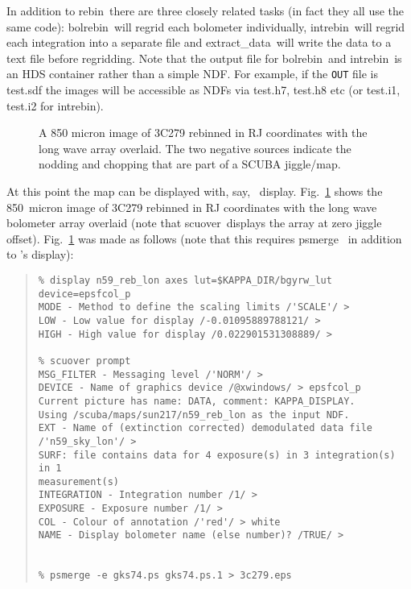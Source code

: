 \documentclass[twoside,11pt]{article}
\newcommand{\Kappa}{\xref{{\sc{Kappa}}}{sun95}{}}
\newcommand{\task}[1]{{\sf #1}}
\newcommand{\param}[1]{{\tt #1}}
\newcommand{\rebin}{\htmlref{\task{rebin}}{REBIN}}
\newcommand{\bolrebin}{\htmlref{\task{bolrebin}}{BOLREBIN}}
\newcommand{\intrebin}{\htmlref{\task{intrebin}}{INTREBIN}}
\newcommand{\scuover}{\htmlref{\task{scuover}}{SCUOVER}}
\newcommand{\extdata}{\htmlref{\task{extract\_data}}{EXTRACT_DATA}}
\newcommand{\display}{\xref{\task{display}}{sun95}{DISPLAY}}
\newcommand{\psmerge}{\xref{\task{psmerge}}{sun164}{}}
\newenvironment{myquote}{\begin{quote}\begin{small}}{\end{small}\end{quote}}
\newcommand{\htmlref}[2]{#1}
\newcommand{\htmlimage}[1]{}
\newcommand{\xref}[3]{#1}
\begin{document}
In addition to \rebin\ there are three closely related tasks (in fact they all
use the same code): \bolrebin\ will regrid each bolometer individually,
\intrebin\ will regrid each integration into a separate file and \extdata\
will write the data to a text file before regridding.  Note that the output
file for \bolrebin\ and \intrebin\ is an HDS container \cite{hds} rather than
a simple NDF.  For example, if the \param{OUT} file is test.sdf the images
will be accessible as NDFs via test.h7, test.h8 etc (or test.i1, test.i2 for
\intrebin).


\begin{figure}
\begin{center}
\htmlimage{scale=0.9}
\caption{A 850 micron image of 3C279 rebinned in RJ coordinates with the
long wave array overlaid. The two negative sources indicate the nodding 
and chopping that are part of a SCUBA jiggle/map.}
\label{image}
\end{center}
\end{figure}

At this point the map can be displayed with, say, \Kappa\ \display. 
Fig.\ \ref{image} shows the 850~micron image of 3C279 rebinned in RJ
coordinates with the long wave bolometer array overlaid (note that 
\scuover\ displays the array at zero jiggle offset).
Fig.\ \ref{image} was made as follows (note that this requires
\psmerge\ \cite{psmerge} in addition to \Kappa's \display):

\begin{myquote}
\begin{verbatim}
% display n59_reb_lon axes lut=$KAPPA_DIR/bgyrw_lut device=epsfcol_p
MODE - Method to define the scaling limits /'SCALE'/ > 
LOW - Low value for display /-0.01095889788121/ > 
HIGH - High value for display /0.022901531308889/ >

% scuover prompt
MSG_FILTER - Messaging level /'NORM'/ > 
DEVICE - Name of graphics device /@xwindows/ > epsfcol_p
Current picture has name: DATA, comment: KAPPA_DISPLAY.
Using /scuba/maps/sun217/n59_reb_lon as the input NDF.
EXT - Name of (extinction corrected) demodulated data file /'n59_sky_lon'/ > 
SURF: file contains data for 4 exposure(s) in 3 integration(s) in 1
measurement(s)
INTEGRATION - Integration number /1/ > 
EXPOSURE - Exposure number /1/ > 
COL - Colour of annotation /'red'/ > white
NAME - Display bolometer name (else number)? /TRUE/ > 


% psmerge -e gks74.ps gks74.ps.1 > 3c279.eps
\end{verbatim}
\end{myquote}
\end{document}
